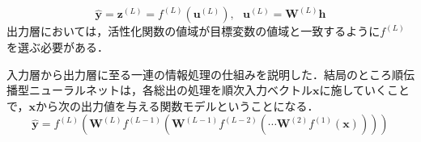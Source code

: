 \documentclass[a4paper,11pt]{jsreport}
\begin{document}
\begin{equation}
  \hat{\bm{y}}
  = \bm{z}^{(L)}
  = f^{(L)}\left( \bm{u}^{(L)} \right), \ \ \
  \bm{u}^{(L)}
  = \bm{W}^{(L)} \bm{h}
\end{equation}
出力層においては，活性化関数の値域が目標変数の値域と一致するように$f^{(L)}$を選ぶ必要がある．\par
入力層から出力層に至る一連の情報処理の仕組みを説明した．結局のところ順伝播型ニューラルネットは，各総出の処理を順次入力ベクトル$\bm{x}$に施していくことで，$\bm{x}$から次の出力値を与える関数モデルということになる．
\begin{equation}
  \hat{\bm{y}}
  = f^{(L)}\left( \bm{W}^{(L)}f^{(L-1)} \left( \bm{W}^{(L-1)}f^{(L-2)} \left( \cdots \bm{W}^{(2)}f^{(1)}(\bm{x}) \right) \right) \right)
\end{equation}
\end{document}
